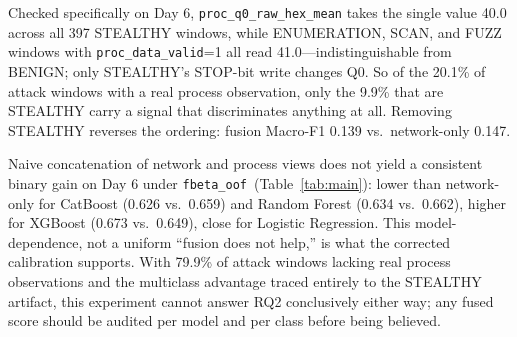 \documentclass[conference]{IEEEtran}
\newcommand{\fbetaoof}{\texttt{fbeta\_oof}}
\begin{document}
Checked specifically on Day 6, \texttt{proc\_q0\_raw\_hex\_mean} takes the single value 40.0 across all
397 STEALTHY windows, while ENUMERATION, SCAN, and FUZZ windows with \texttt{proc\_data\_valid}=1 all
read 41.0---indistinguishable from BENIGN; only STEALTHY's STOP-bit write changes Q0. So of the 20.1\% of
attack windows with a real process observation, only the 9.9\% that are STEALTHY carry a signal that
discriminates anything at all. Removing STEALTHY reverses the ordering: fusion Macro-F1 0.139 vs.\
network-only 0.147.

Naive concatenation of network and process views does not yield a consistent binary gain on Day 6 under
\fbetaoof\ (Table~\ref{tab:main}): lower than network-only for CatBoost (0.626 vs.\ 0.659) and Random
Forest (0.634 vs.\ 0.662), higher for XGBoost (0.673 vs.\ 0.649), close for Logistic Regression. This
model-dependence, not a uniform ``fusion does not help,'' is what the corrected calibration supports.
With 79.9\% of attack windows lacking real process observations and the multiclass advantage traced
entirely to the STEALTHY artifact, this experiment cannot answer RQ2 conclusively either way; any fused
score should be audited per model and per class before being believed.
\end{document}

